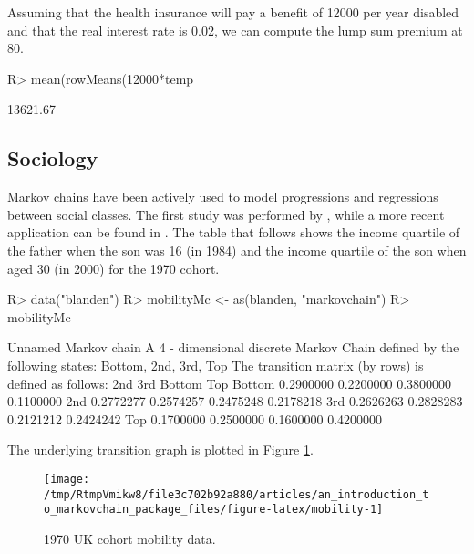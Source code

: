\documentclass[
  nojss]{jss}
\begin{document}
Assuming that the health insurance will pay a benefit of 12000 per year disabled and that the real interest rate is 0.02, we can compute the lump sum premium at 80.

\begin{CodeChunk}

\begin{CodeInput}
R> mean(rowMeans(12000*temp%
\end{CodeInput}

\begin{CodeOutput}
[1] 13621.67
\end{CodeOutput}
\end{CodeChunk}

\hypertarget{app:sociology}{%
\subsection{Sociology}\label{app:sociology}}

Markov chains have been actively used to model progressions and regressions between social classes. The first study was performed by \cite{glassHall}, while a more recent application can be found in \cite{blandenEtAlii}. The table that follows shows the income quartile of the father when the son was 16 (in 1984) and the income quartile of the son when aged 30 (in 2000) for the 1970 cohort.

\begin{CodeChunk}

\begin{CodeInput}
R> data("blanden")
R> mobilityMc <- as(blanden, "markovchain")
R> mobilityMc
\end{CodeInput}

\begin{CodeOutput}
Unnamed Markov chain 
 A  4 - dimensional discrete Markov Chain defined by the following states: 
 Bottom, 2nd, 3rd, Top 
 The transition matrix  (by rows)  is defined as follows: 
             2nd       3rd    Bottom       Top
Bottom 0.2900000 0.2200000 0.3800000 0.1100000
2nd    0.2772277 0.2574257 0.2475248 0.2178218
3rd    0.2626263 0.2828283 0.2121212 0.2424242
Top    0.1700000 0.2500000 0.1600000 0.4200000
\end{CodeOutput}
\end{CodeChunk}

The underlying transition graph is plotted in Figure \ref{fig:mobility}.

\begin{CodeChunk}
\begin{figure}

{\centering \texttt{[image: /tmp/RtmpVmikw8/file3c702b92a880/articles/an\_introduction\_to\_markovchain\_package\_files/figure-latex/mobility-1]} 

}

\caption[1970 UK cohort mobility data]{1970 UK cohort mobility data.}\label{fig:mobility}
\end{figure}
\end{CodeChunk}
\end{document}
